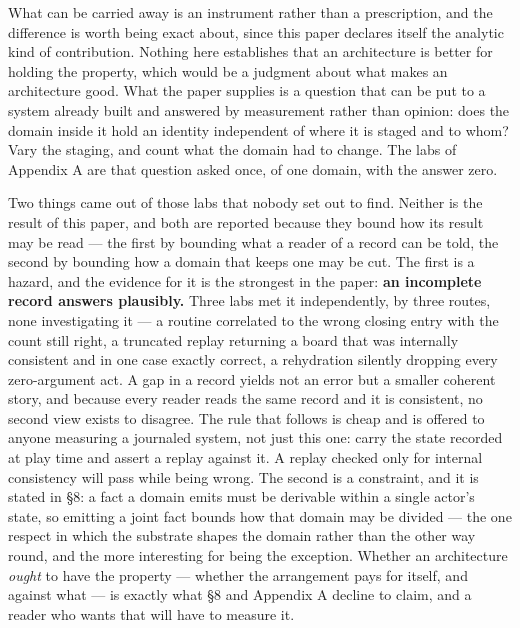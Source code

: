\documentclass[
]{article}
\newcounter{none} %
\begin{document}
What can be carried away is an instrument rather than a prescription,
and the difference is worth being exact about, since this paper declares
itself the analytic kind of contribution. Nothing here establishes that
an architecture is better for holding the property, which would be a
judgment about what makes an architecture good. What the paper supplies
is a question that can be put to a system already built and answered by
measurement rather than opinion: does the domain inside it hold an
identity independent of where it is staged and to whom? Vary the
staging, and count what the domain had to change. The labs of Appendix A
are that question asked once, of one domain, with the answer zero.

Two things came out of those labs that nobody set out to find. Neither
is the result of this paper, and both are reported because they bound
how its result may be read --- the first by bounding what a reader of a
record can be told, the second by bounding how a domain that keeps one
may be cut. The first is a hazard, and the evidence for it is the
strongest in the paper: \textbf{an incomplete record answers plausibly.}
Three labs met it independently, by three routes, none investigating it
--- a routine correlated to the wrong closing entry with the count still
right, a truncated replay returning a board that was internally
consistent and in one case exactly correct, a rehydration silently
dropping every zero-argument act. A gap in a record yields not an error
but a smaller coherent story, and because every reader reads the same
record and it is consistent, no second view exists to disagree. The rule
that follows is cheap and is offered to anyone measuring a journaled
system, not just this one: carry the state recorded at play time and
assert a replay against it. A replay checked only for internal
consistency will pass while being wrong. The second is a constraint, and
it is stated in §8: a fact a domain emits must be derivable within a
single actor's state, so emitting a joint fact bounds how that domain
may be divided --- the one respect in which the substrate shapes the
domain rather than the other way round, and the more interesting for
being the exception. Whether an architecture \emph{ought} to have the
property --- whether the arrangement pays for itself, and against what
--- is exactly what §8 and Appendix A decline to claim, and a reader who
wants that will have to measure it.
\end{document}
